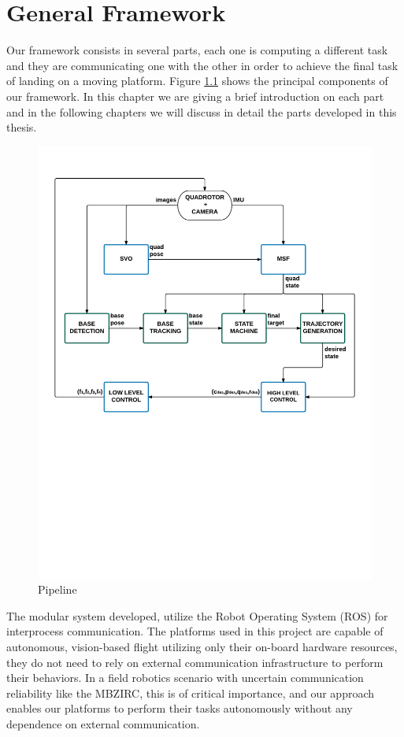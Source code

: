 \chapter{General Framework}\label{chap:general_framework}
Our framework consists in several parts, each one is computing a different task and they are communicating one with the other in order to achieve the final task of landing on a moving platform. Figure \ref{fig:pipeline_diagram} shows the principal components of our framework. In this chapter we are giving a brief introduction on each part and in the following chapters we will discuss in detail the parts developed in this thesis.
\begin{figure}[!ht]
    \centering
    \includegraphics[width=1.0\textwidth]{img/pipeline_diagram.pdf}
    \caption{Pipeline}
    \label{fig:pipeline_diagram}
\end{figure}

The modular system developed, utilize the Robot Operating System (ROS) \cite{ros} for interprocess communication. The platforms used in this project are capable of autonomous, vision-based flight utilizing only their on-board hardware resources, they do not need to rely on external communication infrastructure to perform their behaviors. In a field robotics scenario with uncertain communication reliability like the MBZIRC, this is of critical importance, and our approach enables our platforms to perform their tasks
autonomously without any dependence on external communication.

